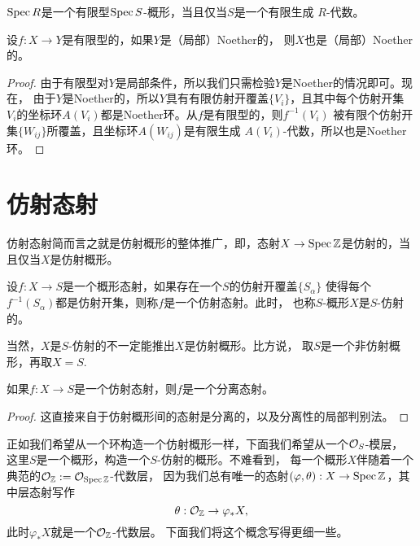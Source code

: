 \begin{lem}
	$\operatorname{Spec} R$是一个有限型$\operatorname{Spec} S$-概形，当且仅当$S$是一个有限生成
	$R$-代数。
\end{lem}

\begin{pro}
设$f:X\to Y$是有限型的，如果$Y$是（局部）Noether的，
则$X$也是（局部）Noether的。
\end{pro}

\begin{proof}
由于有限型对$Y$是局部条件，所以我们只需检验$Y$是Noether的情况即可。现在，
由于$Y$是Noether的，所以$Y$具有有限仿射开覆盖$\{V_i\}$，且其中每个仿射开集
$V_i$的坐标环$A(V_i)$都是Noether环。从$f$是有限型的，则$f^{-1}(V_i)$
被有限个仿射开集$\{W_{ij}\}$所覆盖，且坐标环$A(W_{ij})$是有限生成
$A(V_i)$-代数，所以也是Noether环。
\end{proof}

\section{仿射态射}

仿射态射简而言之就是仿射概形的整体推广，即，态射$X\to \operatorname{Spec} \mathbb{Z}$是仿射的，当且仅当$X$是仿射概形。

\begin{para}[仿射态射]
设$f:X\to S$是一个概形态射，如果存在一个$S$的仿射开覆盖$\{S_\alpha\}$
使得每个$f^{-1}(S_\alpha)$都是仿射开集，则称$f$是一个仿射态射。此时，
也称$S$-概形$X$是$S$-仿射的。
\end{para}

当然，$X$是$S$-仿射的不一定能推出$X$是仿射概形。比方说，
取$S$是一个非仿射概形，再取$X=S$.

\begin{lem}
如果$f:X\to S$是一个仿射态射，则$f$是一个分离态射。
\end{lem}

\begin{proof}
这直接来自于仿射概形间的态射是分离的，以及分离性的局部判别法。
\end{proof}

正如我们希望从一个环构造一个仿射概形一样，下面我们希望从一个$\mathcal{O}_S$-模层，
这里$S$是一个概形，构造一个$S$-仿射的概形。不难看到，
每一个概形$X$伴随着一个典范的$\mathcal{O}_{\mathbb{Z}}:=\mathcal{O}_{\operatorname{Spec} \mathbb{Z}}$-代数层，
因为我们总有唯一的态射$(\varphi,\theta):X\to \operatorname{Spec} \mathbb{Z}$，其中层态射写作
\[
	\theta:\mathcal{O}_{\mathbb{Z}} \to \varphi_*X,
\]
此时$\varphi_* X$就是一个$\mathcal{O}_{\mathbb{Z}}$-代数层。
下面我们将这个概念写得更细一些。

